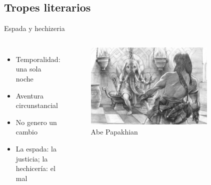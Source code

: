 \subsection{Tropes literarios}
\begin{frame}{Espada y hechizeria}
\begin{columns}
 \begin{itemize}
    \item Temporalidad: una sola noche
    \item Aventura circunstancial
    \item No genero un cambio
    \item La espada: la justicia; la hechicería: el mal
 \end{itemize}
 \begin{figure}[htb]
    \centering
    \includegraphics[width=0.8\textwidth]{img/tributos/elephant07}
    \caption{Abe Papakhian}
 \end{figure} 
 \end{columns}
\end{frame}

